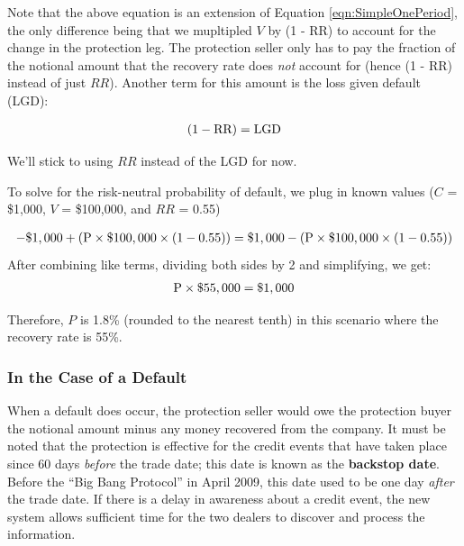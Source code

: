\documentclass{jss}
\begin{document}
Note that the above equation is an extension of Equation \eqref{eqn:SimpleOnePeriod}, the only difference being that we mupltipled $V$ by (1 - RR) to account for the change in the protection leg. The protection seller only has to pay the fraction of the notional amount that the recovery rate does \emph{not} account for (hence (1 - RR) instead of just $RR$). Another term for this amount is the loss given default (LGD):

\begin{equation}
 \begin{aligned}
   {\rm (1 - RR) = LGD}
    \end{aligned}
\label{eqn:recovery}
\end{equation}

We'll stick to using $RR$ instead of the LGD for now.

To solve for the risk-neutral probability of default, we plug in known values ($C$ = \$1,000, $V$ = \$100,000, and $RR$ = 0.55)

\begin{equation}
 \begin{aligned}
   {\rm - \$1,000 + (P \times \$100,000 \times (1 - 0.55)) = \$1,000 - (P \times \$100,000 \times (1 - 0.55))}
    \end{aligned}
\end{equation}
After combining like terms, dividing both sides by 2 and simplifying, we get:
\begin{equation}
 \begin{aligned}
   {\rm P \times \$55,000 = \$1,000}
    \end{aligned}
\end{equation}

Therefore, $P$ is 1.8\% (rounded to the nearest tenth) in this scenario where the recovery rate is 55\%.

\subsubsection{In the Case of a Default}

When a default does occur, the protection seller would owe the protection buyer the notional amount minus any money recovered from the company. It must be noted that the protection is effective for the credit events that have taken place since 60 days \textit{before} the trade date; this date is known as the \textbf{backstop date}. Before the ``Big Bang Protocol'' in April 2009, this date used to be one day \textit{after} the trade date. If there is a delay in awareness about a credit event, the new system allows sufficient time for the two dealers to discover and process the information. 
\end{document}
